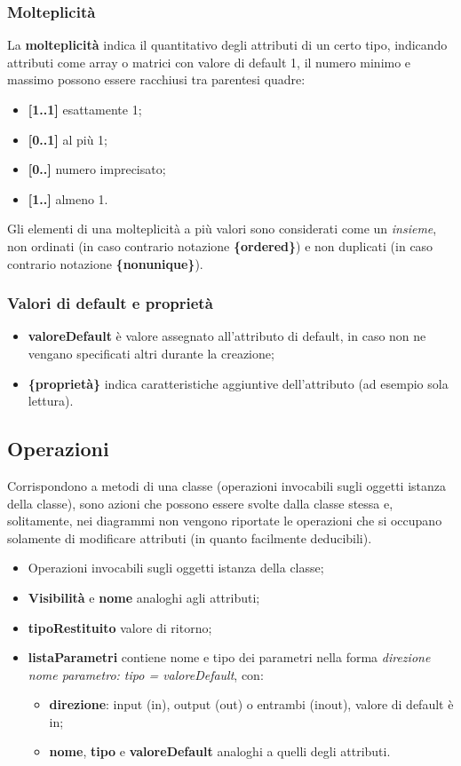 \documentclass{article}
\begin{document}
      \subsubsection{Molteplicità}
        La \textbf{molteplicità} indica il quantitativo degli attributi di un certo tipo, indicando attributi come array o matrici con valore di default 1, il numero minimo e massimo possono essere racchiusi tra parentesi quadre:
        \begin{itemize}
          \item \textbf{[1..1]} esattamente 1;
          \item \textbf{[0..1]} al più 1;
          \item \textbf{[0..\*]} numero imprecisato;
          \item \textbf{[1..\*]} almeno 1.
        \end{itemize}
        Gli elementi di una molteplicità a più valori sono considerati come un \textit{insieme}, non ordinati (in caso contrario notazione \textbf{{\{ordered\}}}) e non duplicati (in caso contrario notazione \textbf{\{nonunique\}}).
      \subsubsection{Valori di default e proprietà}
        \begin{itemize}
          \item \textbf{valoreDefault} è valore assegnato all'attributo di default, in caso non ne vengano specificati altri durante la creazione; 
          \item \textbf{\{proprietà\}} indica caratteristiche aggiuntive dell'attributo (ad esempio sola lettura). 
        \end{itemize}
    \subsection{Operazioni}
      Corrispondono a metodi di una classe (operazioni invocabili sugli oggetti istanza della classe), sono azioni che possono essere svolte dalla classe stessa e, solitamente, nei diagrammi non vengono riportate le operazioni che si occupano solamente di modificare attributi (in quanto facilmente deducibili). 
      \begin{itemize}
        \item Operazioni invocabili sugli oggetti istanza della classe;
        \item \textbf{Visibilità} e \textbf{nome} analoghi agli attributi;
        \item \textbf{tipoRestituito} valore di ritorno;
        \item \textbf{listaParametri} contiene nome e tipo dei parametri nella forma \textit{direzione nome parametro: tipo = valoreDefault}, con:
          \begin{itemize}
            \item \textbf{direzione}: input (in), output (out) o entrambi (inout), valore di default è in; 
            \item \textbf{nome}, \textbf{tipo} e \textbf{valoreDefault} analoghi a quelli degli attributi.
          \end{itemize}
      \end{itemize}
\end{document}
